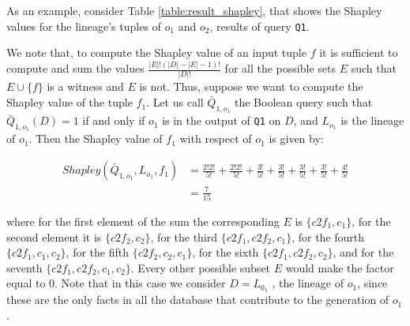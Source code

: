 \documentclass[preprint,12pt,sort&compress]{elsarticle}
\newcommand{\eat}[1]{}
\newcommand{\scream}[1]{{\bf * #1 *}{\typeout{#1}}}
\begin{document}
As an example, consider Table \ref{table:result_shapley}, that shows the Shapley values for the lineage's tuples of $o_1$ and $o_2$, results of query \texttt{Q1}. 
\eat{
Since the tuples of the lineage are the only one with a role in creating the output tuples, when computing the Shapley value we can use it as the set of endogenous facts.
We note that, to compute the Shapley value of an input tuple $f$ it is sufficient to compute and sum the values $\frac{|B|!(|I^n| - |B| - 1)!}{|I^n|!}$ for all the possible sets $B$ such that $B \cup \{f\}$ is a witness and $B$ is not. 
Thus, suppose we want to compute the Shapley value of the tuple $f_1$. Let us call $\bar{Q}_{1, o_1}$ the Boolean query such that $\bar{Q}_{1, o_1}(I) = 1$ if and only if $o_1$ is in the output of \texttt{Q1}, and $L_{o_1}$ the lineage of $o_1$.}
We note that, to compute the Shapley value of an input tuple $f$ it is sufficient to compute and sum the values $\frac{|E|!(|D| - |E| - 1)!}{|D|!}$ for all the possible sets $E$ such that $E \cup \{f\}$ is a witness and $E$ is not. 
Thus, suppose we want to compute the Shapley value of the tuple $f_1$. Let us call $\bar{Q}_{1, o_1}$ the Boolean query such that $\bar{Q}_{1, o_1}(D) = 1$ if and only if $o_1$ is in the output of \texttt{Q1} on $D$, and $L_{o_1}$ is the lineage of $o_1$. 
Then the Shapley value of $f_1$ with respect of $o_1$ is given by:

\[
\begin{array}{ll}
	Shapley(\bar{Q}_{1, o_1}, L_{o_1}, f_1) & = \frac{2!2!}{5!} + \frac{2!2!}{5!} + \frac{3!}{5!} + \frac{3!}{5!}  + \frac{3!}{5!} + \frac{3!}{5!} + \frac{4!}{5!}\\
	& = \frac{7}{15}
\end{array}
\]

\noindent
where for the first element of the sum the corresponding $E$ is $\{c2f_1, c_1\}$, for the second element it is $\{c2f_2, c_2\}$, for the third $\{c2f_1, c2f_2, c_1\}$, for the fourth  $\{c2f_1, c_1, c_2\}$, for the fifth  $\{c2f_2, c_2, c_1\}$, for the sixth  $\{c2f_1, c2f_2, c_2\}$, and for the seventh $\{c2f_1, c2f_2, c_1, c_2\}$. Every other possible subset $E$ would make the factor equal to $0$. Note that in this case we consider $D = L_{0_1}$ , the lineage of $o_1$, since these are the only facts in all the database that contribute to the generation of $o_1$.
\end{document}
